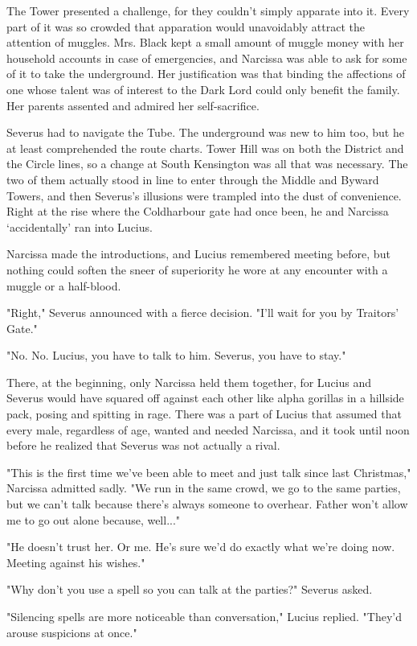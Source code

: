 \documentclass[a4paper,11pt]{article}
\begin{document}
The Tower presented a challenge, for they couldn't simply apparate into it. Every part of it was so crowded that apparation would unavoidably attract the attention of muggles. Mrs. Black kept a small amount of muggle money with her household accounts in case of emergencies, and Narcissa was able to ask for some of it to take the underground. Her justification was that binding the affections of one whose talent was of interest to the Dark Lord could only benefit the family. Her parents assented and admired her self-sacrifice.

Severus had to navigate the Tube. The underground was new to him too, but he at least comprehended the route charts. Tower Hill was on both the District and the Circle lines, so a change at South Kensington was all that was necessary. The two of them actually stood in line to enter through the Middle and Byward Towers, and then Severus's illusions were trampled into the dust of convenience. Right at the rise where the Coldharbour gate had once been, he and Narcissa `accidentally' ran into Lucius.

Narcissa made the introductions, and Lucius remembered meeting before, but nothing could soften the sneer of superiority he wore at any encounter with a muggle or a half-blood.

"Right," Severus announced with a fierce decision. "I'll wait for you by Traitors' Gate."

"No. No. Lucius, you have to talk to him. Severus, you have to stay."

There, at the beginning, only Narcissa held them together, for Lucius and Severus would have squared off against each other like alpha gorillas in a hillside pack, posing and spitting in rage. There was a part of Lucius that assumed that every male, regardless of age, wanted and needed Narcissa, and it took until noon before he realized that Severus was not actually a rival.

"This is the first time we've been able to meet and just talk since last Christmas," Narcissa admitted sadly. "We run in the same crowd, we go to the same parties, but we can't talk because there's always someone to overhear. Father won't allow me to go out alone because, well..."

"He doesn't trust her. Or me. He's sure we'd do exactly what we're doing now. Meeting against his wishes."

"Why don't you use a spell so you can talk at the parties?" Severus asked.

"Silencing spells are more noticeable than conversation," Lucius replied. "They'd arouse suspicions at once."
\end{document}
